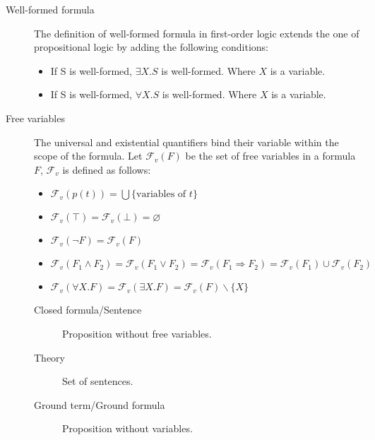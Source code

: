 \begin{description}
    \item[Well-formed formula] 
        The definition of well-formed formula in first-order logic extends the one of
        propositional logic by adding the following conditions:
        \begin{itemize}
            \item If S is well-formed, $\exists X. S$ is well-formed. Where $X$ is a variable.
            \item If S is well-formed, $\forall X. S$ is well-formed. Where $X$ is a variable.
        \end{itemize}

    \item[Free variables] 
        The universal and existential quantifiers bind their variable within the scope of the formula.
        Let $\mathcal{F}_v(F)$ be the set of free variables in a formula $F$, $\mathcal{F}_v$ is defined as follows:
        \begin{itemize}
            \item $\mathcal{F}_v(p(t)) = \bigcup \{ \text{variables of $t$} \}$
            \item $\mathcal{F}_v(\top) = \mathcal{F}_v(\bot) = \varnothing$
            \item $\mathcal{F}_v(\lnot F) = \mathcal{F}_v(F)$
            \item $\mathcal{F}_v(F_1 \land F_2) = \mathcal{F}_v(F_1 \vee  F_2) = \mathcal{F}_v(F_1 \Rightarrow F_2) = \mathcal{F}_v(F_1) \cup \mathcal{F}_v(F_2)$
            \item $\mathcal{F}_v(\forall X.F) = \mathcal{F}_v(\exists X.F) = \mathcal{F}_v(F) \smallsetminus \{ X \}$
        \end{itemize}

        \begin{description}
            \item[Closed formula/Sentence] 
                Proposition without free variables.
            
            \item[Theory] 
                Set of sentences.

            \item[Ground term/Ground formula] 
                Proposition without variables.
        \end{description}
\end{description}



